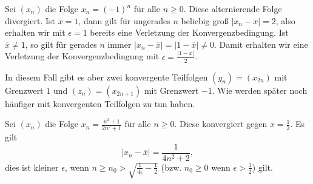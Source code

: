 \label{vorkurs/folgen:example-3}
\begin{example}{}{}



Sei \((x_n)\) die  Folge \(x_n = (-1)^n \) für alle \(n\geq 0\). Diese alternierende Folge divergiert. Ist \(\overline{x} = 1\), dann gilt für ungerades \(n\) beliebig groß \(\vert x_n - \overline{x}\vert = 2\), also erhalten wir mit \(\epsilon =1\) bereits eine Verletzung der Konvergenzbedingung. Ist \(\overline{x} \neq 1\), so gilt für gerades \(n\) immer \(\vert x_n - \overline{x} \vert =  \vert 1-\overline{x} \vert \neq 0\). Damit erhalten wir eine Verletzung der Konvergenzbedingung mit \(\epsilon = \frac{\vert 1-\overline{x} \vert}2\).

In diesem Fall gibt es aber zwei konvergente Teilfolgen \((y_n) = (x_{2n})\) mit Grenzwert \(1\) und \((z_n) = (x_{2n+1})\) mit Grenzwert \(-1\). Wie werden später noch häufiger mit konvergenten Teilfolgen zu tun haben.
\end{example}
\label{vorkurs/folgen:example-4}
\begin{example}{}{}



Sei \((x_n)\) die  Folge \(x_n = \frac{n^2+1}{2n^2+1} \) für alle \(n\geq 0\). Diese konvergiert  gegen \(\overline{x} = \frac{1}2\). Es gilt
\begin{equation*}
 \vert x_n - \overline{x}\vert = \frac{1}{4n^2+2},\end{equation*}
dies ist kleiner \(\epsilon\), wenn \(n \geq n_0 > \sqrt{\frac{1}{4\epsilon}-\frac{1}2}\) (bzw. \(n_0 \geq 0\) wenn \(\epsilon > \frac{1}2\)) gilt.
\end{example}


